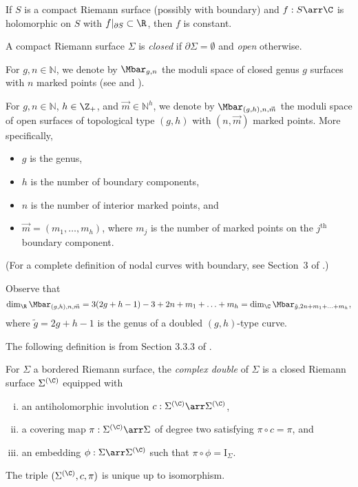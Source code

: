 \begin{lemma} \label{holFnRS}
If $S$ is a compact Riemann surface (possibly with boundary) and $f:S \arr \C$ is holomorphic on $S$ with $f|_{\partial S} \subset \R$, then $f$ is constant.
\end{lemma}

\begin{definition} \label{modDomain}
A compact Riemann surface $\Sigma$ is \emph{closed} if $\partial\Sigma=\emptyset$ and \emph{open} otherwise.

For $g,n \in \mathbb{N}$, we denote by $\Mbar_{g,n}$ the moduli space of closed genus $g$ surfaces with $n$ marked points (see \cite{harris} and \cite{mumford}).

For $g,n \in \mathbb{N}$, $h \in \Z_+$, and $\vec{m} \in \mathbb{N}^h$, we denote by $\Mbar_{(g,h),n,\vec{m}}$ the moduli space of open surfaces of topological type $(g,h)$ with $(n,\vec{m})$ marked points. More specifically, 
\begin{itemize}
\item $g$ is the genus,
\item $h$ is the number of boundary components,
\item $n$ is the number of interior marked points, and
\item $\vec{m}=(m_1,\ldots,m_h)$, where $m_j$ is the number of marked points on the $j^{\text{th}}$ boundary component.
\end{itemize}
(For a complete definition of nodal curves with boundary, see Section~3 of \cite{liu}.)
\end{definition}

Observe that
\[
\dim_\R\Mbar_{(g,h),n,\vec{m}} = 3(2g+h-1)-3+2n+m_1+\ldots+m_h = \dim_\C\Mbar_{\tilde{g},2n+m_1+\ldots+m_h},
\]
where $\tilde{g}=2g+h-1$ is the genus of a doubled $(g,h)$-type curve.

The following definition is from Section 3.3.3 of \cite{katzLiu}.

\begin{definition} \label{cplxDouble}
For $\Sigma$ a bordered Riemann surface, the \emph{complex double} of $\Sigma$ is a closed Riemann surface $\Sigma^{(\C)}$ equipped with
\begin{enumerate}[(i)]
\item an antiholomorphic involution $c:\Sigma^{(\C)}\arr\Sigma^{(\C)}$,
\item a covering map $\pi:\Sigma^{(\C)} \arr \Sigma$ of degree two satisfying $\pi \circ c = \pi$, and
\item an embedding $\phi:\Sigma\arr\Sigma^{(\C)}$ such that $\pi\circ\phi=\text{I}_\Sigma$.
\end{enumerate}
The triple $(\Sigma^{(\C)},c,\pi)$ is unique up to isomorphism.
\end{definition}

